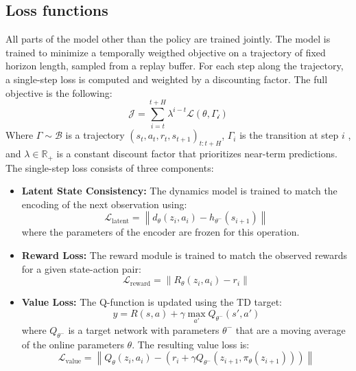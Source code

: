 \documentclass{article}
\begin{document}
\subsection{Loss functions}
All parts of the model other than the policy are trained jointly. The model is trained to minimize a temporally weigthed objective on a trajectory of fixed horizon length, sampled from a replay buffer. For each step along the trajectory, a single-step loss is computed and weighted by a discounting factor. The full objective is the following:
   \begin{equation}
    \mathcal{J} =   \sum_{i=t}^{t+H} \lambda^{i-t} \mathcal{L(\theta,\Gamma_i)}
    \end{equation}
Where $\Gamma \sim \mathcal{B}$ is a trajectory $(s_t,a_t,r_t,s_{t+1})_{t:t+H}$, $\Gamma_i$ is the transition at step $i$ , and $\lambda \in \mathbb{R}_+$ is a constant discount factor that prioritizes near-term predictions.
The single-step loss consists of three components:
\begin{itemize}
    \item{\textbf{Latent State Consistency:}  
    The dynamics model is trained to match the encoding of the next observation using:
    \begin{equation}
    \mathcal{L}_{\text{latent}} = \left\| d_\theta(z_i, a_i) - h_{\theta^-}(s_{i+1}) \right\|
    \end{equation}
    where the parameters of the encoder are frozen for this operation.}

    \item{\textbf{Reward Loss:}  
    The reward module is trained to match the observed rewards for a given state-action pair:
    \begin{equation}
    \mathcal{L}_{\text{reward}} = \left\| R_\theta(z_i, a_i) - r_i \right\|
    \end{equation}}
    
    \item{\textbf{Value Loss:}
    The Q-function is updated using the TD target:
    \begin{equation}
    y = R(s,a) + \gamma \max_{a'} Q_{\theta^-}(s', a')
    \end{equation}
    where $Q_{\theta^-}$ is a target network with parameters $\theta^-$ that are a moving average of the online parameters $\theta$.  
    The resulting value loss is:
    \begin{equation}
    \mathcal{L}_{\text{value}} = \left\| Q_\theta(z_i, a_i) - \left( r_i + \gamma Q_{\theta^-}(z_{i+1}, \pi_\theta(z_{i+1})) \right) \right\|
    \end{equation}}
\end{itemize}
\end{document}
